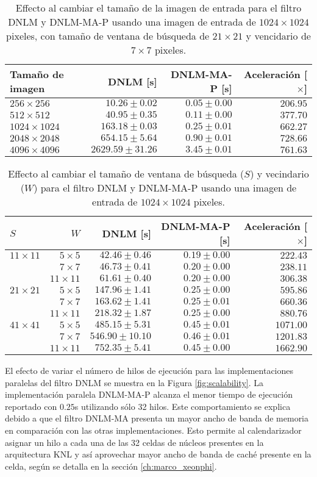 \begin{table}
\protect\caption[Efecto al cambiar tama\~no de imagen de entrada]{Effecto al cambiar el tama\~no de la imagen de entrada para el filtro DNLM y DNLM-MA-P usando una imagen de entrada de  $1024 \times 1024$ pixeles, con tama\~no de ventana de búsqueda de $21 \times 21$ y vencidario de $7 \times 7$ pixeles. \label{tabla:scala1}}
\centering
\begin{tabular}{lrrr}
Tama\~no de imagen & DNLM [s]& DNLM-MA-P [s]& Aceleración [$\times$] \tabularnewline
\hline
$256 \times 256$ & $10.26\pm0.02$ & $0.05\pm0.00$ & $206.95$ \tabularnewline
$512 \times 512$ & $40.95\pm0.35$ & $0.11\pm0.00$ & $377.70$ \tabularnewline
$1024 \times 1024$ & $163.18\pm0.03$ & $0.25\pm0.01$ & $662.27$ \tabularnewline
$2048 \times 2048$ & $654.15\pm5.64$ & $0.90\pm0.01$ & $728.66$ \tabularnewline
$4096 \times 4096$ & $2629.59\pm31.26$ & $3.45\pm0.01$ & $761.63$ \tabularnewline
\end{tabular}
\end{table}


\begin{table}
\protect\caption[Efecto al cambiar parámetros $S$ y $W$]{Effecto al cambiar el tama\~no de ventana de búsqueda ($S$) y vecindario ($W$) para el filtro DNLM y DNLM-MA-P usando una imagen de entrada de  $1024 \times 1024$ pixeles. \label{tabla:scala2}}
\centering
\begin{tabular}{lrrrr}
$S$  & $W$ & DNLM [s] & DNLM-MA-P [s]& Aceleración [$\times$]\tabularnewline
\hline
$11 \times 11$ & $5 \times 5$ & $42.46\pm0.46$ & $0.19\pm0.00$ & $222.43$ \tabularnewline
 & $7 \times 7$ & $46.73\pm0.41$ & $0.20\pm0.00$ & $238.11$ \tabularnewline
 & $11 \times 11$ & $61.61\pm0.40$ & $0.20\pm0.00$ & $306.38$ \tabularnewline
$21 \times 21$ & $5 \times 5$ & $147.96\pm1.41$ & $0.25\pm0.00$ & $595.86$ \tabularnewline
 & $7 \times 7$ & $163.62\pm1.41$ & $0.25\pm0.01$ & $660.36$ \tabularnewline
 & $11 \times 11$ & $218.32\pm1.87$ & $0.25\pm0.00$ & $880.76$ \tabularnewline
 $41 \times 41$ & $5 \times 5$ & $485.15\pm5.31$ & $0.45\pm0.01$ & $1071.00$ \tabularnewline
 & $7 \times 7$ & $546.90\pm10.10$ & $0.46\pm0.01$ & $1201.83$ \tabularnewline
 & $11 \times 11$ & $752.35\pm5.41$ & $0.45\pm0.00$ & $1662.90$ \tabularnewline
\end{tabular}
\end{table}




El efecto de variar el número de hilos de ejecución para las implementaciones paralelas del filtro DNLM se muestra en la Figura \ref{fig:scalability}. La implementación paralela DNLM-MA-P alcanza el menor tiempo de ejecución reportado con $0.25$s utilizando sólo 32 hilos. Este comportamiento se explica debido a que el filtro DNLM-MA presenta un mayor ancho de banda de memoria en comparación con las otras implementaciones. Esto permite al calendarizador asignar un hilo a cada una de las 32 celdas de núcleos presentes en la arquitectura  KNL y así aprovechar mayor ancho de banda de caché presente en la celda, según se detalla en la sección \ref{ch:marco_xeonphi}. 


